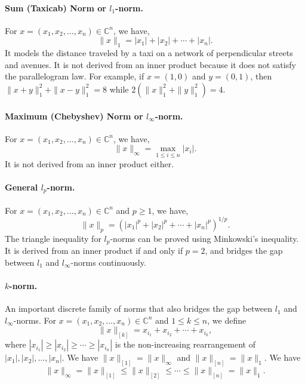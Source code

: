 \documentclass[../main.tex]{subfiles}
\begin{document}
\paragraph{Sum (Taxicab) Norm or $l_1$-norm.} For $x = (x_1, x_2, \ldots, x_n) \in \mathbb{C}^n$, we have,
\begin{equation*}
  \|x\|_1 = |x_1| + |x_2| + \cdots + |x_n|.
\end{equation*}
It models the distance traveled by a taxi on a network of perpendicular streets and avenues. It is not derived from an inner product because it does not satisfy the parallelogram law. For example, if $x = (1, 0)$ and $y = (0, 1)$, then $\|x + y\|_1^2 + \|x - y\|_1^2 = 8$ while $2(\|x\|_1^2 + \|y\|_1^2) = 4$.

\paragraph{Maximum (Chebyshev) Norm or $l_\infty$-norm.} For $x = (x_1, x_2, \ldots, x_n) \in \mathbb{C}^n$, we have,
\begin{equation*}
  \|x\|_\infty = \max_{1 \leq i \leq n} |x_i|.
\end{equation*}
It is not derived from an inner product either.

\paragraph{General $l_p$-norm.} For $x = (x_1, x_2, \ldots, x_n) \in \mathbb{C}^n$ and $p \geq 1$, we have,
\begin{equation}
  \|x\|_p = (|x_1|^p + |x_2|^p + \cdots + |x_n|^p)^{1/p}.
\end{equation}
The triangle inequality for $l_p$-norms can be proved using Minkowski's inequality. It is derived from an inner product if and only if $p = 2$, and bridges the gap between $l_1$ and $l_\infty$-norms continuously.

\paragraph{$k$-norm.} An important discrete family of norms that also bridges the gap between $l_1$ and $l_\infty$-norms. For $x = (x_1, x_2, \ldots, x_n) \in \mathbb{C}^n$ and $1 \leq k \leq n$, we define
\begin{equation}
  \|x\|_{[k]} = x_{i_1} + x_{i_2} + \cdots + x_{i_k},
\end{equation}
where $|x_{i_1}| \geq |x_{i_2}| \geq \cdots \geq |x_{i_n}|$ is the non-increasing rearrangement of $|x_1|, |x_2|, \ldots, |x_n|$. We have $\|x\|_{[1]} = \|x\|_\infty$ and $\|x\|_{[n]} = \|x\|_1$. We have
\begin{equation*}
  \|x\|_\infty = \|x\|_{[1]} \leq \|x\|_{[2]} \leq \cdots \leq \|x\|_{[n]} = \|x\|_1.
\end{equation*}
\end{document}

